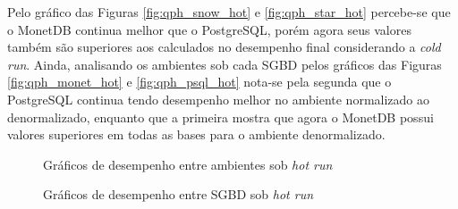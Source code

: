 Pelo gráfico das Figuras \ref{fig:qph_snow_hot} e \ref{fig:qph_star_hot} percebe-se que o MonetDB continua melhor que o PostgreSQL, porém agora seus valores também são superiores aos calculados no desempenho final considerando a \textit{cold run}. Ainda, analisando os ambientes sob cada SGBD pelos gráficos das Figuras \ref{fig:qph_monet_hot} e \ref{fig:qph_psql_hot} nota-se pela segunda que o PostgreSQL continua tendo desempenho melhor no ambiente normalizado ao denormalizado, enquanto que a primeira mostra que agora o MonetDB possui valores superiores em todas as bases para o ambiente denormalizado.

\begin{figure}[htpb]
        \centering
        \caption{Gráficos de desempenho entre ambientes sob \textit{hot run}}
        \label{fig:qph_model_hot}
\end{figure}
    
\begin{figure}[htpb]
        \centering
        \caption{Gráficos de desempenho entre SGBD sob \textit{hot run}}
        \label{fig:qph_sgbd_hot}
\end{figure}

